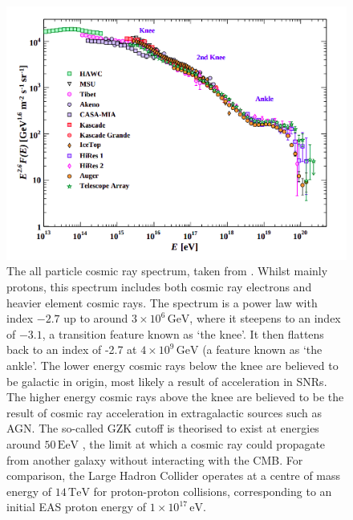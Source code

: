 \begin{figure}
\begin{center}  

\includegraphics[width=\columnwidth]{figures/pdgcr.png}
 
\caption{The all particle cosmic ray spectrum, taken from \cite{pdg}. Whilst mainly protons, this spectrum includes both cosmic ray electrons and heavier element cosmic rays. The spectrum is a power law with index $\mathrm{-2.7}$ up to around $\mathrm{3 \times 10^6\,GeV}$, where it steepens to an index of $\mathrm{-3.1}$, a transition feature known as `the knee'. It then flattens back to an index of -2.7 at $\mathrm{4 \times 10^9\,GeV}$ (a feature known as `the ankle'. The lower energy cosmic rays below the knee are believed to be galactic in origin, most likely a result of acceleration in SNRs. The higher energy cosmic rays above the knee are believed to be the result of cosmic ray acceleration in extragalactic sources such as AGN. The so-called GZK cutoff is theorised to exist at energies around $\mathrm{50\,EeV}$ \cite{gzk}, the limit at which a cosmic ray could propagate from another galaxy without interacting with the CMB. For comparison, the Large Hadron Collider operates at a centre of mass energy of $\mathrm{14\,TeV}$ for proton-proton collisions, corresponding to an initial EAS proton energy of $\mathrm{1\times 10^{17}\,eV}$.}
\label{fig:crspec}
\end{center}
\end{figure}

